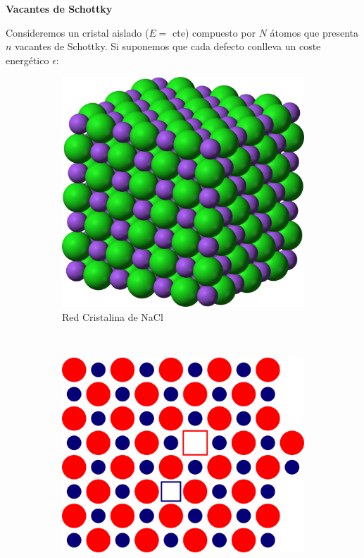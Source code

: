 \documentclass[a4paper,11pt]{article}
\begin{document}
\vspace{1em}
\textbf{Vacantes de Schottky}
\vspace{0.5em}

Consideremos un cristal aislado ($E = $ cte) compuesto por $N$ átomos 
que presenta $n$ vacantes de Schottky.
Si suponemos que cada defecto conlleva un coste energético $\epsilon$:


\begin{figure}[b]
    \centering
    \begin{subfigure}[b]{0.3\textwidth}
        \includegraphics[width=\textwidth]{figs/NaCl.png}
        \caption{Red Cristalina de NaCl}
        \label{fig:nacl}
    \end{subfigure}
    ~
    \begin{subfigure}[b]{0.3\textwidth}
        \includegraphics[width=\textwidth]{figs/schottky.png}

\end{subfigure}
\end{figure}
\end{document}
